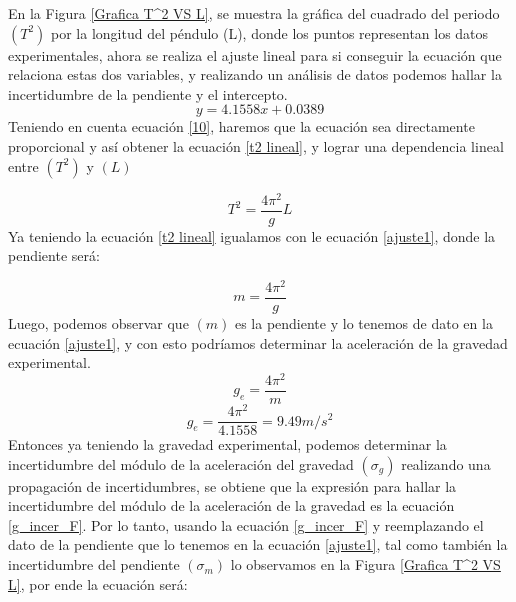 \documentclass[10pt,a4paper]{article}
\begin{document}
\begin{multicols}{2}
En la Figura \ref{Grafica T^2 VS L}, se muestra la gráfica del cuadrado del periodo $(T^{2})$ por la longitud del péndulo (L), donde los puntos representan los datos experimentales, ahora se realiza el ajuste lineal para si conseguir la ecuación que relaciona estas dos variables, y realizando un análisis de datos podemos hallar la incertidumbre de la pendiente y el intercepto.
\begin{equation}
	y=4.1558 x +0.0389
	\label{ajuste1}
\end{equation}
Teniendo en cuenta ecuación \ref{10}, haremos que la ecuación sea directamente proporcional y así obtener la ecuación \ref{t2 lineal}, y lograr una dependencia lineal entre $(T^{2})$ y $(L)$

\begin{equation}
T^{2}=\frac{4 \pi^{2}}{g}L
\label{t2 lineal}
\end{equation}
 Ya teniendo la ecuación \ref{t2 lineal} igualamos con le ecuación \ref{ajuste1}, donde la pendiente será: 
 
\begin{equation}
 	m=\frac{4 \pi^{2}}{g}
 	\label{m_ecua}
\end{equation}
Luego, podemos observar que $(m)$ es la pendiente y lo tenemos de dato en la ecuación \ref{ajuste1}, y con esto podríamos determinar la aceleración de la gravedad experimental.
\begin{equation}
	g_{e}=\frac{4 \pi^{2}}{m}
	\label{g_ecua}
\end{equation}
\begin{equation}
	g_{e}=\frac{4 \pi^{2}}{4.1558} = 9.49 m/s^2
	\label{g_ecua_R}
\end{equation}
Entonces ya teniendo la gravedad experimental, podemos determinar la incertidumbre del módulo de la aceleración del gravedad $(\sigma_{g})$ realizando una propagación de incertidumbres, se obtiene que la expresión para hallar la incertidumbre del módulo de la aceleración de la gravedad es la ecuación \ref{g_incer_F}. Por lo tanto, usando la ecuación \ref{g_incer_F} y reemplazando el dato de la pendiente que lo tenemos en la ecuación \ref{ajuste1}, tal como también la incertidumbre del pendiente $(\sigma_{m})$ lo observamos en la Figura \ref{Grafica T^2 VS L}, por ende la ecuación será:


\end{multicols}
\end{document}
